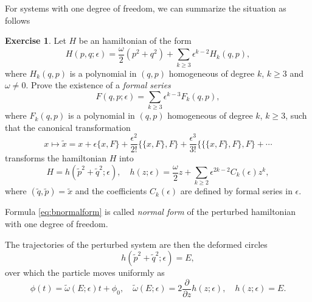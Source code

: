 \documentclass[english,fontsize=11pt,paper=b5]{scrbook}
\numberwithin{equation}{chapter}
\theoremstyle{definition}
\newtheorem{exercise}{Exercise}[chapter]
\begin{document}
      For systems with one degree of freedom, we can summarize the situation as follows
      \begin{exercise}
        Let $H$ be an hamiltonian of the form
        \begin{equation}
          H(p,q; \epsilon) = \frac{\omega}{2}(p^2 + q^2) + \sum_{k\geq 3} \epsilon^{k-2} H_k(q,p),
        \end{equation}
        where $H_k(q,p)$ is a polynomial in $(q,p)$ homogeneous of degree $k$, $k\geq3$ and $\omega \neq 0$.
        Prove the existence of a \emph{formal series}
        \begin{equation}
          F(q,p; \epsilon) = \sum_{k\geq 3} \epsilon^{k-3} F_k(q,p),
        \end{equation}
        where $F_k(q,p)$ is a polynomial in $(q,p)$ homogeneous of degree $k$, $k\geq3$, such that the canonical transformation
        \begin{equation}\label{eq:ictbnf}
          x \mapsto \widetilde x = x + \epsilon \big\{x, F\big\}
          + \frac{\epsilon^2}{2!} \big\{\big\{x, F\big\}, F\big\}
          + \frac{\epsilon^3}{3!} \big\{\big\{\big\{x, F\big\}, F\big\}, F\big\} + \cdots
        \end{equation}
        transforms the hamiltonian $H$ into
        \begin{equation}\label{eq:bnormalform}
          H = h(\widetilde p^2 + \widetilde q^2; \epsilon),\quad
          h(z;\epsilon) = \frac\omega2 z + \sum_{k\geq 2} \epsilon^{2k-2}C_k(\epsilon) z^k,
        \end{equation}
        where $(\widetilde q, \widetilde p) = \widetilde x$ and the coefficients $C_k(\epsilon)$ are defined by formal series in $\epsilon$.
      \end{exercise}

      Formula \eqref{eq:bnormalform} is called \emph{normal form} of the perturbed hamiltonian with one degree of freedom.

      The trajectories of the perturbed system are then the deformed circles
      \begin{equation}
        h(\widetilde p^2 + \widetilde q^2; \epsilon) = E,
      \end{equation}
      over which the particle moves uniformly as
      \begin{equation}
        \phi(t) = \widetilde\omega(E;\epsilon) t + \phi_0,
        \quad \widetilde\omega(E; \epsilon) = 2\frac{\partial}{\partial z}h(z;\epsilon), \quad h(z;\epsilon) = E.
      \end{equation}
\end{document}
